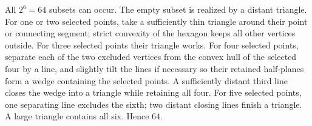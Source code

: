 All $ 2^6=64 $ subsets can occur. The empty subset is realized by a distant triangle. For one or two selected points, take a sufficiently thin triangle around their point or connecting segment; strict convexity of the hexagon keeps all other vertices outside. For three selected points their triangle works. For four selected points, separate each of the two excluded vertices from the convex hull of the selected four by a line, and slightly tilt the lines if necessary so their retained half-planes form a wedge containing the selected points. A sufficiently distant third line closes the wedge into a triangle while retaining all four. For five selected points, one separating line excludes the sixth; two distant closing lines finish a triangle. A large triangle contains all six. Hence $\boxed{64}$. 
